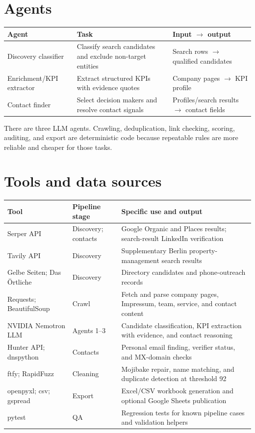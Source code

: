 \documentclass[10pt,a4paper]{article}
\begin{document}
\section{Agents}
\begin{tabularx}{\linewidth}{@{}lYY@{}}
\toprule Agent & Task & Input $\rightarrow$ output\\\midrule
Discovery classifier & Classify search candidates and exclude non-target entities & Search rows $\rightarrow$ qualified candidates\\
Enrichment/KPI extractor & Extract structured KPIs with evidence quotes & Company pages $\rightarrow$ KPI profile\\
Contact finder & Select decision makers and resolve contact signals & Profiles/search results $\rightarrow$ contact fields\\
\bottomrule
\end{tabularx}

There are three LLM agents. Crawling, deduplication, link checking, scoring, auditing, and export are deterministic code because repeatable rules are more reliable and cheaper for those tasks.

\section{Tools and data sources}
\small
\renewcommand{\arraystretch}{1.22}
\begin{tabularx}{\linewidth}{@{}p{2.8cm}p{3.2cm}Y@{}}
\toprule
\textbf{Tool} & \textbf{Pipeline stage} & \textbf{Specific use and output}\\
\midrule
Serper API & Discovery; contacts & Google Organic and Places results; search-result LinkedIn verification\\
\addlinespace[2pt]\midrule
Tavily API & Discovery & Supplementary Berlin property-management search results\\
\addlinespace[2pt]\midrule
Gelbe Seiten; Das Örtliche & Discovery & Directory candidates and phone-outreach records\\
\addlinespace[2pt]\midrule
Requests; BeautifulSoup & Crawl & Fetch and parse company pages, Impressum, team, service, and contact content\\
\addlinespace[2pt]\midrule
NVIDIA Nemotron LLM & Agents 1--3 & Candidate classification, KPI extraction with evidence, and contact reasoning\\
\addlinespace[2pt]\midrule
Hunter API; dnspython & Contacts & Personal email finding, verifier status, and MX-domain checks\\
\addlinespace[2pt]\midrule
ftfy; RapidFuzz & Cleaning & Mojibake repair, name matching, and duplicate detection at threshold 92\\
\addlinespace[2pt]\midrule
openpyxl; csv; gspread & Export & Excel/CSV workbook generation and optional Google Sheets publication\\
\addlinespace[2pt]\midrule
pytest & QA & Regression tests for known pipeline cases and validation helpers\\
\bottomrule
\end{tabularx}
\normalsize
\end{document}
